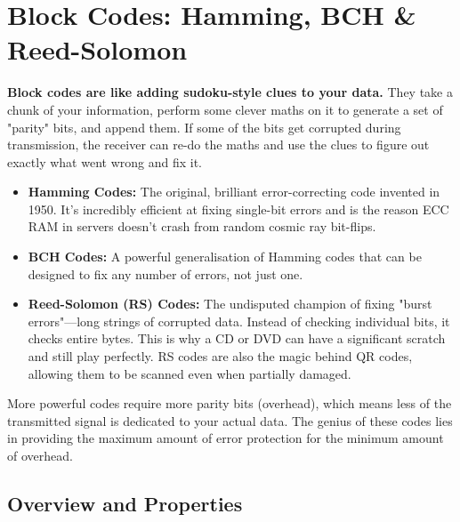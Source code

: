
\chapter{Block Codes: Hamming, BCH \& Reed-Solomon}
\label{ch:block-codes}

\begin{nontechnical}
    \textbf{Block codes are like adding sudoku-style clues to your data.} They take a chunk of your information, perform some clever maths on it to generate a set of "parity" bits, and append them. If some of the bits get corrupted during transmission, the receiver can re-do the maths and use the clues to figure out exactly what went wrong and fix it.

    \begin{itemize}
        \item \textbf{Hamming Codes:} The original, brilliant error-correcting code invented in 1950. It's incredibly efficient at fixing single-bit errors and is the reason ECC RAM in servers doesn't crash from random cosmic ray bit-flips.
        \item \textbf{BCH Codes:} A powerful generalisation of Hamming codes that can be designed to fix any number of errors, not just one.
        \item \textbf{Reed-Solomon (RS) Codes:} The undisputed champion of fixing "burst errors"---long strings of corrupted data. Instead of checking individual bits, it checks entire bytes. This is why a CD or DVD can have a significant scratch and still play perfectly. RS codes are also the magic behind QR codes, allowing them to be scanned even when partially damaged.
    \end{itemize}

     More powerful codes require more parity bits (overhead), which means less of the transmitted signal is dedicated to your actual data. The genius of these codes lies in providing the maximum amount of error protection for the minimum amount of overhead.
\end{nontechnical}


\section{Overview and Properties}

